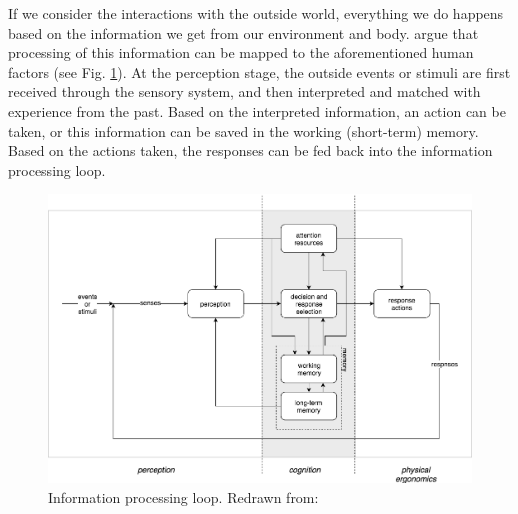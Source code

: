 
If we consider the interactions with the outside world, everything we do happens based on the information we get from our environment and body. \parencite{jr_3d_2017} argue that processing of this information can be mapped to the aforementioned human factors (see Fig. \ref{fig:informationprocessingloop}).
At the perception stage, the outside events or stimuli are first received through the sensory system, and then interpreted and matched with experience from the past. Based on the interpreted information, an action can be taken, or this information can be saved in the working (short-term) memory. 
Based on the actions taken, the responses can be fed back into the information processing loop.

\begin{figure}
	\centering
	\includegraphics[width=0.9\linewidth]{figures/information_processing_loop}
	\caption{Information processing loop. Redrawn from: \parencite{jr_3d_2017}}
	\label{fig:informationprocessingloop}
\end{figure}

